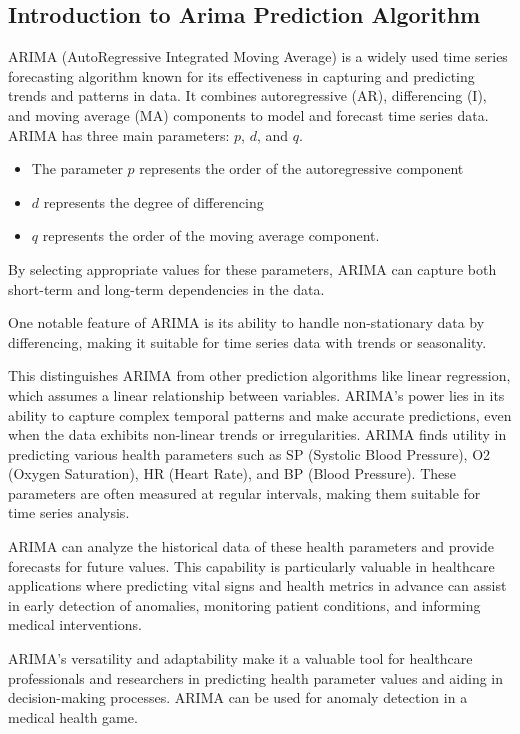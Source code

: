 \documentclass[conference]{IEEEtran}
\begin{document}
\subsection{Introduction to Arima Prediction Algorithm}

ARIMA (AutoRegressive Integrated Moving Average) is a widely used time series forecasting algorithm known for its effectiveness in capturing and predicting trends and patterns in data. It combines autoregressive (AR), differencing (I), and moving average (MA) components to model and forecast time series data. ARIMA has three main parameters: $p$, $d$, and $q$. 
\begin{itemize}
\item 
The parameter $p$ represents the order of the autoregressive component
\item $d$ represents the degree of differencing
\item $q$ represents the order of the moving average component. 
\end{itemize}
By selecting appropriate values for these parameters, ARIMA can capture both short-term and long-term dependencies in the data.

One notable feature of ARIMA is its ability to handle non-stationary data by differencing, making it suitable for time series data with trends or seasonality.

This distinguishes ARIMA from other prediction algorithms like linear regression, which assumes a linear relationship between variables. ARIMA's power lies in its ability to capture complex temporal patterns and make accurate predictions, even when the data exhibits non-linear trends or irregularities.
ARIMA finds utility in predicting various health parameters such as SP (Systolic Blood Pressure), O2 (Oxygen Saturation), HR (Heart Rate), and BP (Blood Pressure). These parameters are often measured at regular intervals, making them suitable for time series analysis. 

ARIMA can analyze the historical data of these health parameters and provide forecasts for future values. This capability is particularly valuable in healthcare applications where predicting vital signs and health metrics in advance can assist in early detection of anomalies, monitoring patient conditions, and informing medical interventions. 

ARIMA's versatility and adaptability make it a valuable tool for healthcare professionals and researchers in predicting health parameter values and aiding in decision-making processes.
ARIMA can be used for anomaly detection in a medical health game.
\end{document}
